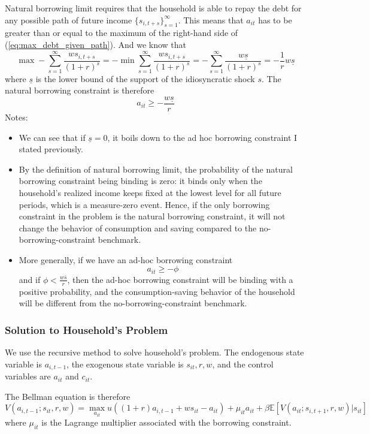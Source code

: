 \documentclass[12pt]{article}
\begin{document}
Natural borrowing limit requires that the household is able to repay the debt for any possible path of future income $\{s_{i,t+s}\}_{s=1}^\infty$. This means that $a_{it}$ has to be greater than or equal to the maximum of the right-hand side of (\ref{eq:max_debt_given_path}). And we know that
\[\max  - \sum_{s=1}^\infty \frac{ws_{i,t+s}}{(1+r)^{s}} = - \min \sum_{s=1}^\infty \frac{ws_{i,t+s}}{(1+r)^{s}} = - \sum_{s=1}^\infty \frac{w \underline{s}}{(1+r)^s} = -\frac{1}{r}w \underline{s}\]
where $\underline{s}$ is the lower bound of the support of the idiosyncratic shock $s$. The natural borrowing constraint is therefore
\begin{equation}
	a_{it} \geq -\frac{w\underline{s}}{r}
\end{equation}
Notes:
\begin{itemize}
	\item We can see that if $\underline{s} = 0$, it boils down to the ad hoc borrowing constraint I stated previously. 
	\item By the definition of natural borrowing limit, the probability of the natural borrowing constraint being binding is zero: it binds only when the household's realized income keeps fixed at the lowest level for all future periods, which is a measure-zero event. Hence, if the only borrowing constraint in the problem is the natural borrowing constraint, it will not change the behavior of consumption and saving compared to the no-borrowing-constraint benchmark.
	\item More generally, if we have an ad-hoc borrowing constraint 
	\[a_{it} \geq - \phi\]
	and if $\phi < \frac{w\bar{s}}{r}$, then the ad-hoc borrowing constraint will be binding with a positive probability, and the consumption-saving behavior of the household will be different from the no-borrowing-constraint benchmark.
\end{itemize}


\subsubsection{Solution to Household's Problem} 
We use the recursive method to solve household's problem. The endogenous state variable is $a_{i,t-1}$, the exogenous state variable is $s_{it}, r, w$, and the control variables are $a_{it}$ and $c_{it}$.

The Bellman equation is therefore
\begin{equation}
	V(a_{i,t-1}; s_{it}, r, w) = \max_{a_{it}} u\left((1+r)a_{i,t-1} + ws_{it} - a_{it}\right) + \mu_{it} a_{it} + \beta \mathbb{E}\left[V(a_{it}; s_{i,t+1}, r, w)|s_{it}\right]
\end{equation}
where $\mu_{it}$ is the Lagrange multiplier associated with the borrowing constraint. 
\end{document}

